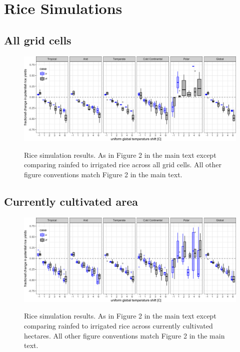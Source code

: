 \documentclass[10pt]{article}
\begin{document}
\clearpage
\section{Rice Simulations}
\subsection{All grid cells}
\begin{figure}[h!]
\includegraphics[width=\textwidth]{s_rice_sim_CG.png}\\
\caption{Rice simulation results. As in Figure 2 in the main text except comparing rainfed to irrigated rice across all grid cells. All other figure conventions match Figure 2 in the main text.}
\label{fig:maizeCG}
\end{figure}

\subsection{Currently cultivated area}
\begin{figure}[h!]
\includegraphics[width=\textwidth]{s_rice_sim_CG_area_weight.png}\\
\caption{Rice simulation results. As in Figure 2 in the main text except comparing rainfed to irrigated rice across currently cultivated hectares. All other figure conventions match Figure 2 in the main text.}
\label{fig:maizeCG}
\end{figure}
\end{document}
